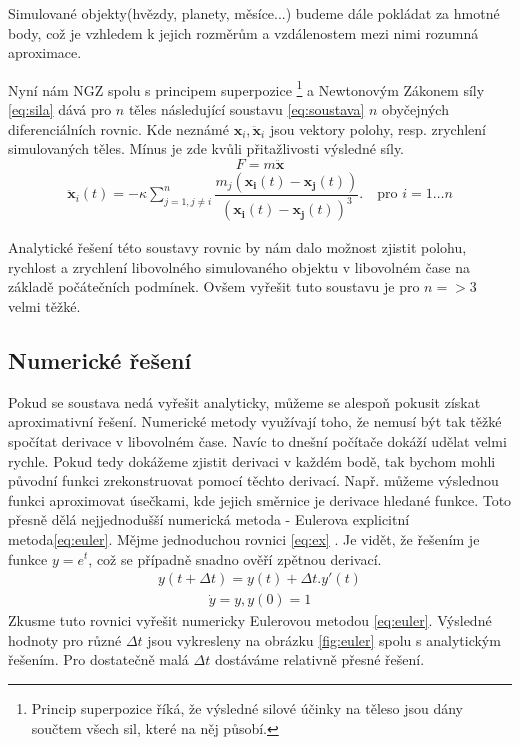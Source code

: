 Simulované objekty(hvězdy, planety, měsíce...) budeme dále pokládat za hmotné body, což je vzhledem k jejich rozměrům a vzdálenostem mezi nimi rozumná aproximace.

Nyní nám NGZ spolu s principem superpozice
\footnote{Princip superpozice říká, že výsledné silové účinky na těleso jsou dány součtem všech sil, které na něj působí.}
 a Newtonovým Zákonem síly \eqref{eq:sila} dává pro $ n $ těles následující soustavu \eqref{eq:soustava} $ n $ obyčejných diferenciálních rovnic. 
 Kde neznámé $ \boldsymbol {x}_i, \boldsymbol{\ddot x}_i $ jsou vektory polohy, resp. zrychlení simulovaných těles. Mínus je zde kvůli přitažlivosti výsledné síly.
\begin{equation}
F= m  \boldsymbol {\ddot x}
\label{eq:sila}
\end{equation}
\begin{align}\label{eq:soustava}
\boldsymbol {\ddot x}_i(t)  = -\kappa \sum_{j=1,j \neq i}^{n}\dfrac{m_j\left( \boldsymbol{x_i}(t) - \boldsymbol{x_j}(t)\right)}
{\left( \boldsymbol{x_i}(t) - \boldsymbol{x_j}(t)\right) ^3} . 
\quad \text{pro } i=1 \dots n
\end{align}

Analytické řešení této soustavy rovnic by nám dalo možnost zjistit polohu, rychlost a zrychlení libovolného simulovaného objektu v libovolném čase na základě počátečních podmínek. Ovšem vyřešit tuto soustavu je pro $ n=>3 $ velmi těžké.

\subsection{Numerické řešení}
\label{sec:numReseni}
Pokud se soustava nedá vyřešit analyticky, můžeme se alespoň pokusit získat aproximativní řešení. Numerické metody využívají toho, že nemusí být tak těžké spočítat derivace v libovolném čase. Navíc to dnešní počítače dokáží udělat velmi rychle. Pokud tedy dokážeme zjistit derivaci v každém bodě, tak bychom mohli původní funkci zrekonstruovat pomocí těchto derivací. Např. můžeme výslednou funkci aproximovat úsečkami, kde jejich směrnice je derivace hledané funkce. Toto přesně dělá nejjednodušší numerická metoda - Eulerova explicitní metoda\eqref{eq:euler}.
Mějme jednoduchou rovnici \eqref{eq:ex} . Je vidět, že řešením je funkce $ y=e^t $, což se případně snadno ověří zpětnou derivací. 
\begin{align} \label{eq:euler}
y(t+\Delta t) = y(t) + \Delta t . y'(t)
\end{align}
\begin{align} \label{eq:ex}
\dot	y = y, y(0)=1
\end{align}
Zkusme tuto rovnici vyřešit numericky Eulerovou metodou \eqref{eq:euler}. 
Výsledné hodnoty pro různé  $ \Delta t $ jsou vykresleny na obrázku \ref{fig:euler} spolu s analytickým řešením.
Pro dostatečně malá  $ \Delta t $ dostáváme relativně přesné řešení.

